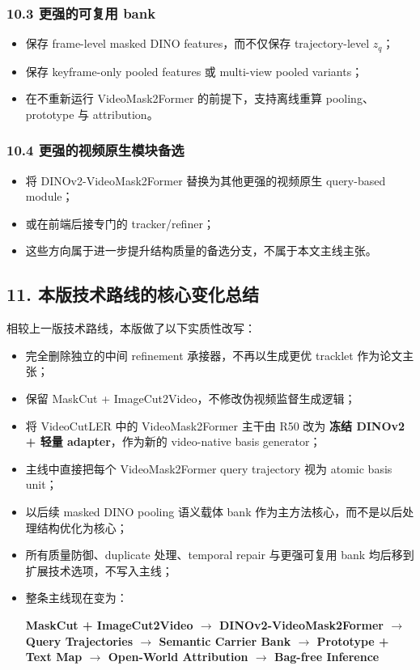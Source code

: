 \documentclass[UTF8]{ctexart}
\begin{document}
\subsubsection*{10.3 更强的可复用 bank}
\begin{itemize}
\item 保存 frame-level masked DINO features，而不仅保存 trajectory-level $z_q$；
\item 保存 keyframe-only pooled features 或 multi-view pooled variants；
\item 在不重新运行 VideoMask2Former 的前提下，支持离线重算 pooling、prototype 与 attribution。
\end{itemize}

\subsubsection*{10.4 更强的视频原生模块备选}
\begin{itemize}
\item 将 DINOv2-VideoMask2Former 替换为其他更强的视频原生 query-based module；
\item 或在前端后接专门的 tracker/refiner；
\item 这些方向属于进一步提升结构质量的备选分支，不属于本文主线主张。
\end{itemize}

\par\noindent\hrulefill\par

\subsection*{11. 本版技术路线的核心变化总结}
相较上一版技术路线，本版做了以下实质性改写：
\begin{itemize}
\item 完全删除独立的中间 refinement 承接器，不再以生成更优 tracklet 作为论文主张；
\item 保留 MaskCut + ImageCut2Video，不修改伪视频监督生成逻辑；
\item 将 VideoCutLER 中的 VideoMask2Former 主干由 R50 改为 \textbf{冻结 DINOv2 + 轻量 adapter}，作为新的 video-native basis generator；
\item 主线中直接把每个 VideoMask2Former query trajectory 视为 atomic basis unit；
\item 以后续 masked DINO pooling 语义载体 bank 作为主方法核心，而不是以后处理结构优化为核心；
\item 所有质量防御、duplicate 处理、temporal repair 与更强可复用 bank 均后移到扩展技术选项，不写入主线；
\item 整条主线现在变为：
\begin{center}
\textbf{MaskCut + ImageCut2Video $\rightarrow$ DINOv2-VideoMask2Former $\rightarrow$ Query Trajectories $\rightarrow$ Semantic Carrier Bank $\rightarrow$ Prototype + Text Map $\rightarrow$ Open-World Attribution $\rightarrow$ Bag-free Inference}
\end{center}
\end{itemize}
\end{document}
